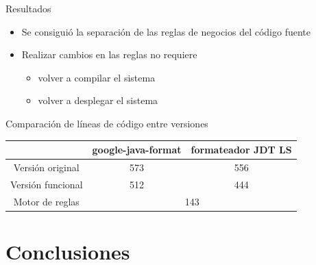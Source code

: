 \documentclass[10pt]{beamer}
\begin{document}
\begin{frame}{Resultados}
    \begin{itemize}
        \item Se consiguió la separación de las reglas de negocios del código fuente
        \item Realizar cambios en las reglas no requiere
            \begin{itemize}
                \item volver a compilar el sistema
                \item volver a desplegar el sistema
            \end{itemize}
    \end{itemize}
    \begin{block}{Comparación de líneas de código entre versiones}
        \begin{table}
            \centering
            \begin{tabular}{|c|c|c|}
                \hline
                & google-java-format & formateador JDT LS \\ \hline
                Versión original & 573 & 556 \\ \hline
                Versión funcional & 512 & 444 \\ \hline
                Motor de reglas & \multicolumn{2}{c|}{143} \\ \hline
            \end{tabular}
        \end{table}
    \end{block}
\end{frame}

\section{Conclusiones}
\end{document}
